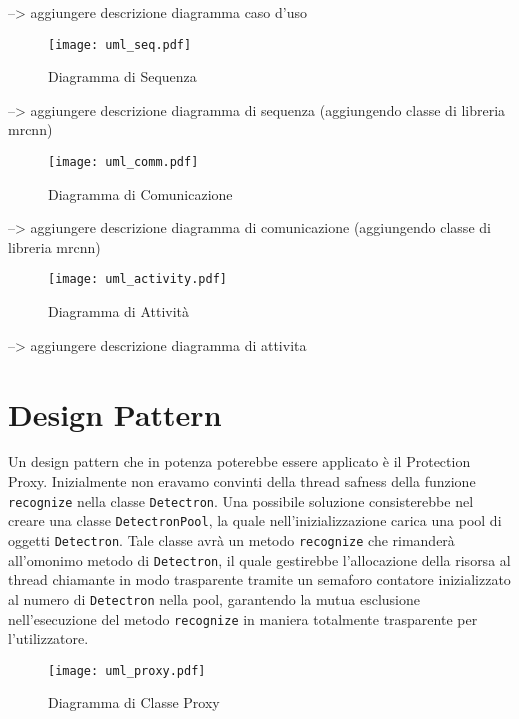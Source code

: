 \documentclass[12pt,a4paper]{article}
\begin{document}
--> aggiungere descrizione diagramma caso d'uso

\begin{figure}[p]
  \caption{Diagramma di Sequenza}
  \centering
  \texttt{[image: uml\_seq.pdf]}
\end{figure}

--> aggiungere descrizione diagramma di sequenza (aggiungendo classe di libreria mrcnn)

\begin{figure}[p]
  \caption{Diagramma di Comunicazione}
  \centering
  \texttt{[image: uml\_comm.pdf]}
\end{figure}

--> aggiungere descrizione diagramma di comunicazione (aggiungendo classe di libreria mrcnn)

\begin{figure}[p]
  \caption{Diagramma di Attività}
  \centering
  \texttt{[image: uml\_activity.pdf]}
\end{figure}

--> aggiungere descrizione diagramma di attivita

\pagebreak

\section{Design Pattern}

Un design pattern che in potenza poterebbe essere applicato è il
Protection Proxy. Inizialmente non eravamo convinti della thread safness
della funzione \texttt{recognize} nella classe \texttt{Detectron}. Una
possibile soluzione consisterebbe nel creare una classe
\texttt{DetectronPool}, la quale nell'inizializzazione carica una pool
di oggetti \texttt{Detectron}. Tale classe avrà un metodo
\texttt{recognize} che rimanderà all'omonimo metodo di
\texttt{Detectron}, il quale gestirebbe l'allocazione della risorsa al
thread chiamante in modo trasparente tramite un semaforo contatore
inizializzato al numero di \texttt{Detectron} nella pool, garantendo la
mutua esclusione nell'esecuzione del metodo \texttt{recognize} in
maniera totalmente trasparente per l'utilizzatore.

\begin{figure}[h]
  \caption{Diagramma di Classe Proxy}
  \centering
  \texttt{[image: uml\_proxy.pdf]}
\end{figure}
\end{document}
